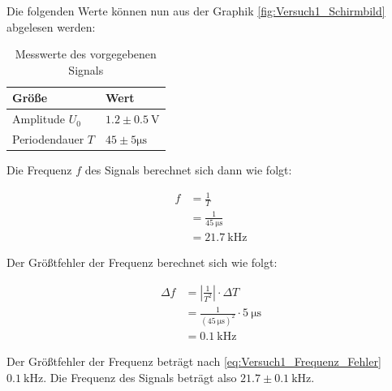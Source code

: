         Die folgenden Werte können nun aus der Graphik \ref{fig:Versuch1_Schirmbild} abgelesen werden:

        \begin{table}[H]
            \centering
            \caption{Messwerte des vorgegebenen Signals}
            \vspace*{1em}
            \begin{tabular}{|l|l|}
                \hline
                \textbf{Größe} & \textbf{Wert}\\
                \hline
                \hline
                Amplitude $U_0$ & $1.2 \pm 0.5\ \mathrm{V}$\\
                \hline
                Periodendauer $T$ & $45 \pm 5 \mathrm{\mu s}$\\
                \hline
            \end{tabular}
            
            \label{tab:Versuch1_Messwerte}
        \end{table}
        
        Die Frequenz $f$ des Signals berechnet sich dann wie folgt:

        \begin{equation}
            \begin{aligned}
                f &= \frac{1}{T}\\
                  &= \frac{1}{45\ \mathrm{\mu s}}\\
                  &= 21.7\ \mathrm{kHz}
            \end{aligned}
            \label{eq:Versuch1_Frequenz}
        \end{equation}

        Der Größtfehler der Frequenz berechnet sich wie folgt:

        \begin{equation}
            \begin{aligned}
                \Delta f &= \left|\frac{1}{T^{2}}\right| \cdot \Delta T\\
                         &= \frac{1}{(45\ \mathrm{\mu s})^{2}} \cdot 5\ \mathrm{\mu s}\\
                         &= 0.1\ \mathrm{kHz}
            \label{eq:Versuch1_Frequenz_Fehler}
            \end{aligned}
        \end{equation}
            
        Der Größtfehler der Frequenz beträgt nach \ref{eq:Versuch1_Frequenz_Fehler} $0.1\ \mathrm{kHz}$. Die Frequenz des Signals beträgt also $21.7 \pm 0.1\ \mathrm{kHz}$.
    
